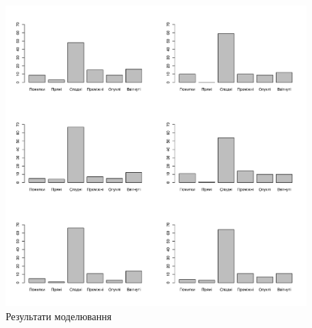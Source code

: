 \begin{figure}[h]
  \centering
  \includegraphics[width=\textwidth]{images/poisson_types}
  \caption{Результати моделювання}
  \label{fig:tapping:poisson:types}
\end{figure}
